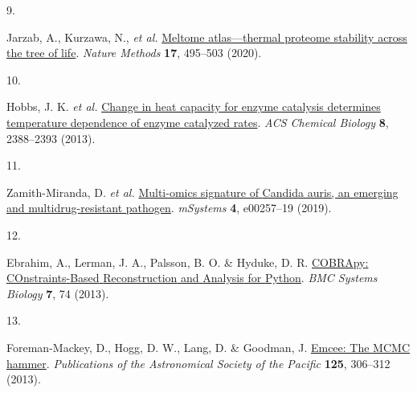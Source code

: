 \documentclass[
]{article}
\newlength{\cslhangindent}
\newlength{\csllabelwidth}
\newenvironment{CSLReferences}[2] %
 {\begin{list}{}{%
  \setlength{\itemindent}{0pt}
  \setlength{\leftmargin}{0pt}
  \setlength{\parsep}{0pt}
  \ifodd #1
   \setlength{\leftmargin}{\cslhangindent}
   \setlength{\itemindent}{-1\cslhangindent}
  \fi
  \setlength{\itemsep}{#2\baselineskip}}}
 {\end{list}}
\newcommand{\CSLLeftMargin}[1]{\parbox[t]{\csllabelwidth}{\strut#1\strut}}
\newcommand{\CSLRightInline}[1]{\parbox[t]{\linewidth - \csllabelwidth}{\strut#1\strut}}
\begin{document}
\begin{CSLReferences}{0}{0}
\CSLLeftMargin{9. }%
\CSLRightInline{{Jarzab, A., Kurzawa, N., \emph{et al.}}
\href{https://doi.org/10.1038/s41592-020-0801-4}{Meltome atlas---thermal
proteome stability across the tree of life}. \emph{Nature Methods}
\textbf{17}, 495--503 (2020).}

\CSLLeftMargin{10. }%
\CSLRightInline{Hobbs, J. K. \emph{et al.}
\href{https://doi.org/10.1021/cb4005029}{Change in heat capacity for
enzyme catalysis determines temperature dependence of enzyme catalyzed
rates}. \emph{ACS Chemical Biology} \textbf{8}, 2388--2393 (2013).}

\CSLLeftMargin{11. }%
\CSLRightInline{Zamith-Miranda, D. \emph{et al.}
\href{https://doi.org/10.1128/mSystems.00257-19}{Multi-omics signature
of {Candida} auris, an emerging and multidrug-resistant pathogen}.
\emph{mSystems} \textbf{4}, e00257--19 (2019).}

\CSLLeftMargin{12. }%
\CSLRightInline{Ebrahim, A., Lerman, J. A., Palsson, B. O. \& Hyduke, D.
R. \href{https://doi.org/10.1186/1752-0509-7-74}{{COBRApy}:
{COnstraints}-{Based} {Reconstruction} and {Analysis} for {Python}}.
\emph{BMC Systems Biology} \textbf{7}, 74 (2013).}

\CSLLeftMargin{13. }%
\CSLRightInline{Foreman-Mackey, D., Hogg, D. W., Lang, D. \& Goodman, J.
\href{https://doi.org/10.1086/670067}{Emcee: The {MCMC} hammer}.
\emph{Publications of the Astronomical Society of the Pacific}
\textbf{125}, 306--312 (2013).}

\end{CSLReferences}
\end{document}
